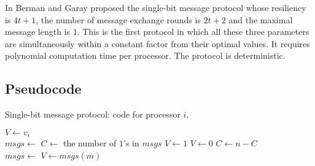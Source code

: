 In \cite{BG89} Berman and Garay proposed the single-bit message protocol whose resiliency is $4t+1$, the number of message exchange rounds is $2t+2$ and the maximal message length is $1$. This is the first protocol in which all these three parameters are simultaneously within a constant factor from their optimal values. It requires polynomial computation time per processor. The protocol is deterministic.

\subsection{Pseudocode}
\begin{breakablealgorithm} \label{sb:code}
  \caption{Single-bit message protocol: code for processor $i$.}
  \begin{algorithmic}[1]
    \State $V \gets v_i$
        \State {} \label{sb:code:er0_broadcast}
        \\
        \State $msgs \gets$  \label{sb:code:er1_receive}
        \State $C \gets$ the number of $1$'s in $msgs$
             \label{sb:code:er1_if}
                \State $V \gets 1$ \label{sb:code:er1_vgets1}
            \Else
                \State $V \gets 0$ \label{sb:code:er1_vgets0}
                \State $C \gets n-C$
            \EndIf
            \State {} \label{sb:code:er1_broadcast}
        \EndIf
        \\
        \State $msgs \gets$  \label{sb:code:er2_receive}
         \label{sb:code:er2_if}
            \State $V \gets msgs(m)$ \label{sb:code:er2_vgetsx}
        \EndIf
    \EndFor
  \end{algorithmic}
\end{breakablealgorithm}

